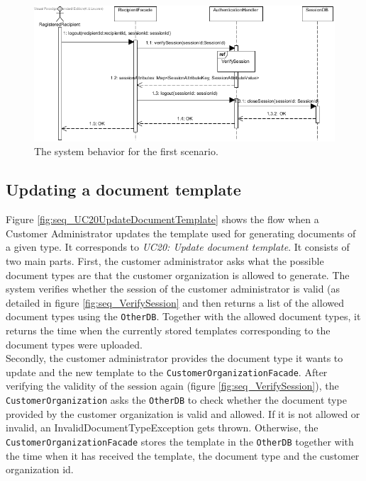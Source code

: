 \documentclass[a4paper,10pt]{article}
\begin{document}
\begin{figure}[!htp]
    \centering
    \includegraphics[width=\textwidth]{Seq_UC2LogOut.png}
    \caption{The system behavior for the first scenario.
        }\label{fig:seq_UC2LogOut}
\end{figure}



\subsection{Updating a document template}
Figure \ref{fig:seq_UC20UpdateDocumentTemplate} shows the flow when a Customer Administrator updates the template used for generating documents of a given type. It corresponds to \emph{UC20: Update document template}. It consists of two main parts. First, the customer administrator asks what the possible document types are that the customer organization is allowed to generate. The system verifies whether the session of the customer administrator is valid (as detailed in figure \ref{fig:seq_VerifySession} and then returns a list of the allowed document types using the \texttt{OtherDB}.  Together with the allowed document types, it returns the  time when the currently stored templates corresponding to the document types were uploaded.\\
Secondly, the customer administrator provides the document type it wants to update and the new template to the \texttt{CustomerOrganizationFacade}. After verifying the validity of the session again (figure \ref{fig:seq_VerifySession}), the \texttt{CustomerOrganization} asks the \texttt{OtherDB} to check whether the document type provided by the customer organization is valid and allowed. If it is not allowed or invalid, an InvalidDocumentTypeException gets thrown. Otherwise, the \texttt{CustomerOrganizationFacade} stores the template in the \texttt{OtherDB} together with the time when it has received the template, the document type and the customer organization id.
\end{document}
